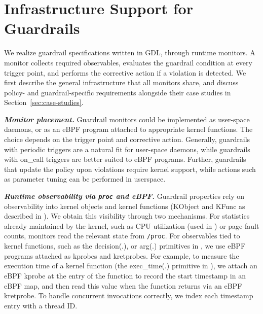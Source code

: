 \section{Infrastructure Support for Guardrails}\label{sec:infra}

We realize guardrail specifications written in GDL, through runtime monitors. A monitor collects required observables, evaluates the guardrail condition at every trigger point, and performs the corrective action if a violation is detected. We first describe the general infrastructure that all monitors share, and discuss policy- and guardrail-specific requirements alongside their case studies in Section~\ref{sec:case-studies}.

\medskip\noindent
{\it \textbf{Monitor placement.}}
Guardrail monitors could be implemented as user-space daemons, or as an eBPF program attached to appropriate kernel functions.
The choice depends on the trigger point and corrective action.
Generally, guardrails with {\sf periodic} triggers are a natural fit for user-space daemons, while guardrails with {\sf on\_call} triggers are better suited to eBPF programs.
Further, guardrails that update the policy upon violations require kernel support, while actions such as parameter tuning can be performed in userspace.


\medskip\noindent
{\it \textbf{Runtime observability via {\tt proc} and eBPF.}}
Guardrail properties rely on observability into kernel objects and kernel functions ({\sf KObject} and {\sf KFunc} as described in ). 
We obtain this visibility through two mechanisms.
For statistics already maintained by the kernel, such as CPU utilization (used in ) or page-fault counts, monitors read the relevant state from {\tt /proc}.
For observables tied to kernel functions, such as the {\sf decision(.)}, or {\sf arg(.)} primitives in , we use eBPF programs attached as kprobes and kretprobes.
For example, to measure the execution time of a kernel function (the {\sf exec\_time(.)} primitive in ), we attach an eBPF kprobe at the entry of the function to record the start timestamp in an eBPF map, and then read this value when the function returns via an eBPF kretprobe. To handle concurrent invocations correctly, we index each timestamp entry with a thread ID.


